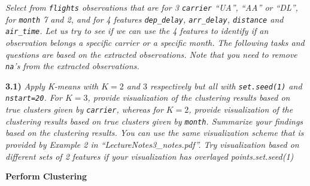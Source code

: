 \documentclass[
]{article}
\newenvironment{Shaded}{\begin{snugshade}}{\end{snugshade}}
\newcommand{\DecValTok}[1]{\textcolor[rgb]{0.00,0.00,0.81}{#1}}
\newcommand{\FunctionTok}[1]{\textcolor[rgb]{0.13,0.29,0.53}{\textbf{#1}}}
\newcommand{\NormalTok}[1]{#1}
\newcommand{\OtherTok}[1]{\textcolor[rgb]{0.56,0.35,0.01}{#1}}
\newcommand{\SpecialCharTok}[1]{\textcolor[rgb]{0.81,0.36,0.00}{\textbf{#1}}}
\newcommand{\StringTok}[1]{\textcolor[rgb]{0.31,0.60,0.02}{#1}}
\begin{document}
\emph{Select from \texttt{flights} observations that are for 3
\texttt{carrier} ``UA'', ``AA'' or ``DL'', for \texttt{month} 7 and 2,
and for 4 features \texttt{dep\_delay}, \texttt{arr\_delay},
\texttt{distance} and \texttt{air\_time}. Let us try to see if we can
use the 4 features to identify if an observation belongs a specific
carrier or a specific month. The following tasks and questions are based
on the extracted observations. Note that you need to remove
\texttt{na}'s from the extracted observations.}

\begin{Shaded}
\end{Shaded}

\textbf{3.1)} \emph{Apply K-means with \(K=2\) and \(3\) respectively
but all with \texttt{set.seed(1)} and \texttt{nstart=20}. For \(K=3\),
provide visualization of the clustering results based on true clusters
given by \texttt{carrier}, whereas for \(K=2\), provide visualization of
the clustering results based on true clusters given by \texttt{month}.
Summarize your findings based on the clustering results. You can use the
same visualization scheme that is provided by Example 2 in
``LectureNotes3\_notes.pdf''. Try visualization based on different sets
of 2 features if your visualization has overlayed points.set.seed(1)}

\textbf{Perform Clustering}
\end{document}

